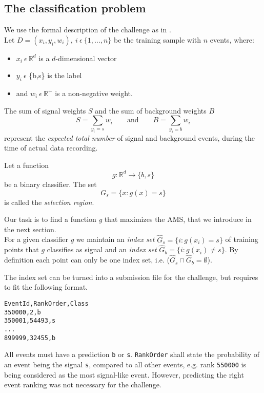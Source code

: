 \subsection{The classification problem}\label{sec:prob}
We use the formal description of the challenge as in \cite{higgsPaper}.\\
Let $D = {(x_i,y_i,w_i)}, \ i \ \epsilon \ \{1,\ldots,n\}$ be the training sample with $n$ events, where:

\begin{itemize}
	\item $x_i \ \epsilon \ \mathbb{R}^{d}$ is a $d$-dimensional vector
	\item $y_i \ \epsilon$ \{b,s\} is the label
	\item and $w_i \ \epsilon \ \mathbb{R}^{+}$ is a non-negative weight.
\end{itemize}

\pagebreak
The sum of signal weights $S$ and the sum of background weights $B$
$$S = \sum_{y_i = s} w_i \mathrm{\hspace{2em} and \hspace{2em}} B = \sum_{y_i = b} w_i$$
represent the \emph{expected total number} of signal and background events, during the time of actual data recording.

Let a function $$g: \mathbb{R}^{d} \rightarrow \{b,s\}$$
be a binary classifier.
The set $$G_s = \{x : g(x) = s \}$$ is called the \emph{selection region}.

Our task is to find a function \emph{g} that maximizes the AMS, that we introduce in the next section.\\
For a given classifier \emph{g} we maintain an \emph{index set} 
$ \hat{G}_s = \{i : g(x_i) = s \} $ of training points that $g$ classifies as signal and an \emph{index set} $ \hat{G}_b = \{i : g(x_i) \neq s \} $. By definition each point can only be one index set, i.e. ($\hat{G}_s \cap \hat{G}_b = \emptyset$).

The index set can be turned into a submission file for the challenge, but requires to fit the following format.

\begin{verbatim}
EventId,RankOrder,Class
350000,2,b
350001,54493,s
...
899999,32455,b
\end{verbatim}

All events must have a prediction \texttt{b} or \texttt{s}. \texttt{RankOrder} shall state the probability of an event being the signal \texttt{s}, compared to all other events, e.g. rank \texttt{550000} is being considered as the most signal-like event. However, predicting the right event ranking was not necessary for the challenge.